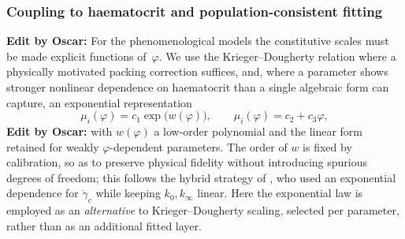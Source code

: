 \documentclass[lineno]{jfm}
\newcommand{\orn}[1]{{\color{red} \textbf{Edit by Oscar:} #1}}
\begin{document}
\subsubsection{Coupling to haematocrit and population-consistent fitting}
\label{subsec:phi_coupling}

\orn{For the phenomenological models the constitutive scales must be made explicit
functions of~$\varphi$. We use the Krieger--Dougherty relation
\citep{Krieger1959} where a physically motivated packing correction suffices,
and, where a parameter shows stronger nonlinear dependence on haematocrit than a
single algebraic form can capture, an exponential representation}
\begin{equation}
\mu_i(\varphi)=c_1\exp\!\bigl(w(\varphi)\bigr),
\qquad
\mu_i(\varphi)=c_2+c_3\varphi,
\label{eq:phi_scaling}
\end{equation}
\orn{with $w(\varphi)$ a low-order polynomial and the linear form retained for weakly
$\varphi$-dependent parameters. The order of $w$ is fixed by calibration, so as
to preserve physical fidelity without introducing spurious degrees of freedom;
this follows the hybrid strategy of \citet{CokeletA1963,CokeletB1963}, who used
an exponential dependence for $\dot\gamma_c$ while keeping $k_0,k_\infty$ linear.
Here the exponential law is employed as an \emph{alternative} to
Krieger--Dougherty scaling, selected per parameter, rather than as an additional
fitted layer.}
\end{document}
